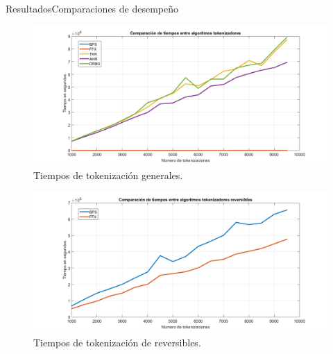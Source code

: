 \begin{frame}{Resultados}{Comparaciones de desempeño}
{{\begin{table}
\begin{center}
          \caption{Comparación de tiempos de tokenización.}
          \label{tabla:tiempos_tokenizacion}
        \end{center}
      \end{table}
    }
  }

  {
    \begin{figure}[H]
      \begin{center}
        \includegraphics[width=1.0\linewidth]
          {../../../diagramas_comunes/desempenio/tok_todos.png}
        \caption{Tiempos de tokenización generales.}
      \end{center}
    \end{figure}
  }

  {
    \begin{figure}[H]
      \begin{center}
        \includegraphics[width=1.0\linewidth]
          {../../../diagramas_comunes/desempenio/tok_rev.png}
        \caption{Tiempos de tokenización de reversibles.}
      \end{center}
    \end{figure}
  }


\end{frame}
